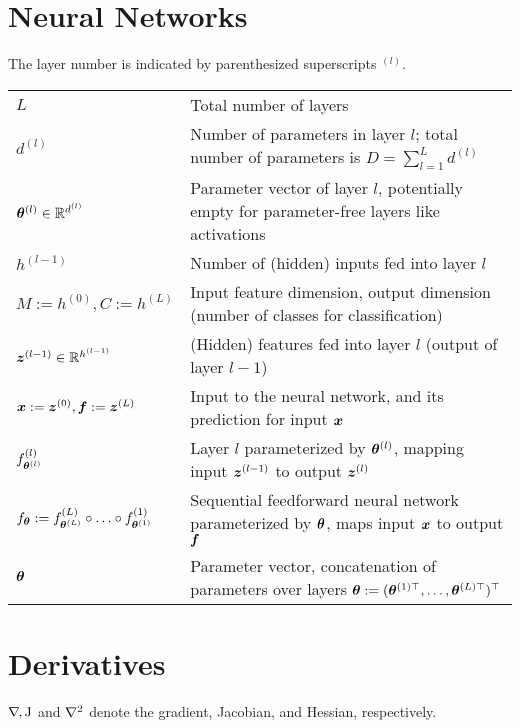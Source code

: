 \section*{Neural Networks}

The layer number is indicated by parenthesized superscripts $^{(l)}$.

\begin{longtable}{p{.2\linewidth}p{.8\linewidth}}
  $L$
  & Total number of layers
  \\
  $d^{(l)}$
  & Number of parameters in layer $l$; total number of parameters is $D =
  \sum_{l=1}^L d^{(l)}$
  \\
  ${\bm{\theta}}^{(l)} \in {\mathbb{R}}^{d^{(l)}}$
  & Parameter vector of layer $l$, potentially empty
  for parameter-free layers like activations
  \\
  $h^{(l-1)}$
  & Number of (hidden) inputs fed into layer $l$
  \\
  $M := h^{(0)},C := h^{(L)}$ & Input feature dimension, output dimension
  (number of classes for classification)
  \\
  ${\bm{z}}^{(l-1)} \in {\mathbb{R}}^{h^{(l-1)}}$
  & (Hidden) features fed into layer $l$ (output of layer $l-1$)
  \\
  ${\bm{x}} := {\bm{z}}^{(0)}, {\bm{f}} := {\bm{z}}^{(L)}$
  & Input to the neural network, and its prediction for input ${\bm{x}}$
  \\
  $f^{(l)}_{{\bm{\theta}}^{(l)}}$
  & Layer $l$ parameterized by ${\bm{\theta}}^{(l)}$, mapping input
  ${\bm{z}}^{(l-1)}$ to output ${\bm{z}}^{(l)}$
  \\
  $f_{{\bm{\theta}}}:= f^{(L)}_{{\bm{\theta}}^{(L)}} \circ \ldots \circ f^{(1)}_{{\bm{\theta}}^{(1)}}$
  & Sequential feedforward neural network parameterized by ${\bm{\theta}}$, maps input ${\bm{x}}$ to output ${\bm{f}}$
  \\
  ${\bm{\theta}}$
  & Parameter vector, concatenation of parameters over layers
  ${\bm{\theta}} := ({\bm{\theta}}^{(1)\top}, \dots, {\bm{\theta}}^{(L)\top})^\top$
  \\
\end{longtable}

\section*{Derivatives}

$\nabla_{\!{}},\mathrm{J}$ and $\nabla_{\!{}}^{2}$ denote the gradient, Jacobian, and Hessian,
respectively.

